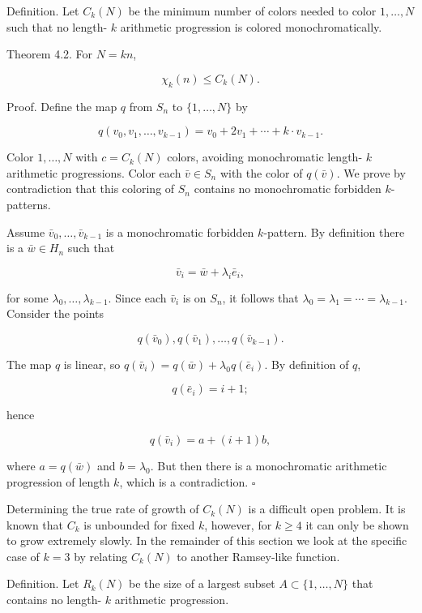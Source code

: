 \documentclass[10pt]{article}
\begin{document}
Definition. Let $C_{k}(N)$ be the minimum number of colors needed to color $1, \ldots, N$ such that no length- $k$ arithmetic progression is colored monochromatically.

Theorem 4.2. For $N=k n$,

$$
\chi_{k}(n) \leq C_{k}(N) .
$$

Proof. Define the map $q$ from $S_{n}$ to $\{1, \ldots, N\}$ by

$$
q\left(v_{0}, v_{1}, \ldots, v_{k-1}\right)=v_{0}+2 v_{1}+\cdots+k \cdot v_{k-1} .
$$

Color $1, \ldots, N$ with $c=C_{k}(N)$ colors, avoiding monochromatic length- $k$ arithmetic progressions. Color each $\bar{v} \in S_{n}$ with the color of $q(\bar{v})$. We prove by contradiction that this coloring of $S_{n}$ contains no monochromatic forbidden $k$-patterns.

Assume $\bar{v}_{0}, \ldots, \bar{v}_{k-1}$ is a monochromatic forbidden $k$-pattern. By definition there is a $\bar{w} \in H_{n}$ such that

$$
\bar{v}_{i}=\bar{w}+\lambda_{i} \bar{e}_{i},
$$

for some $\lambda_{0}, \ldots, \lambda_{k-1}$. Since each $\bar{v}_{i}$ is on $S_{n}$, it follows that $\lambda_{0}=\lambda_{1}=\cdots=\lambda_{k-1}$. Consider the points

$$
q\left(\bar{v}_{0}\right), q\left(\bar{v}_{1}\right), \ldots, q\left(\bar{v}_{k-1}\right) .
$$

The map $q$ is linear, so $q\left(\bar{v}_{i}\right)=q(\bar{w})+\lambda_{0} q\left(\bar{e}_{i}\right)$. By definition of $q$,

$$
q\left(\bar{e}_{i}\right)=i+1 ;
$$

hence

$$
q\left(\bar{v}_{i}\right)=a+(i+1) b,
$$

where $a=q(\bar{w})$ and $b=\lambda_{0}$. But then there is a monochromatic arithmetic progression of length $k$, which is a contradiction. \(\square\)

Determining the true rate of growth of $C_{k}(N)$ is a difficult open problem. It is known that $C_{k}$ is unbounded for fixed $k$, however, for $k \geq 4$ it can only be shown to grow extremely slowly. In the remainder of this section we look at the specific case of $k=3$ by relating $C_{k}(N)$ to another Ramsey-like function.

Definition. Let $R_{k}(N)$ be the size of a largest subset $A \subset\{1, \ldots, N\}$ that contains no length- $k$ arithmetic progression.
\end{document}
